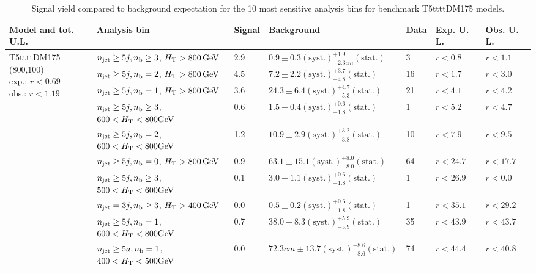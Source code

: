 \begin{table}[h!] 
  \scriptsize
  \caption{ 
Signal yield compared to background expectation for the 10 most sensitive analysis bins 
for benchmark T5ttttDM175 models.
  \label{tab:sigBenchmarksYields_T5ttttDM175}}
  \centering 
  \begin{tabular}{ lllllll } 
    \hline 
    \hline 
    Model and tot. U.L. & Analysis bin & Signal & Background & Data & Exp. U. L. & Obs. U. L. \\ \hline
\multirow{10}{*}{\parbox[t]{2.3cm}{T5ttttDM175 (800,100)\\exp.: $r<0.69$\\obs.: $r<1.19$}}
 & $n_{\mathrm{jet}} \geq5j,n_{\text{b}} \geq3$, $\mbox{$H_\text{T}$} > 800 \, \mathrm{GeV}$ & 2.9 & $0.9 \pm 0.3 \mathrm{(syst.)} ^{+1.9}_{-2.3cm} \mathrm{(stat.)}$ & 3 & $r < 0.8$ & $r < 1.1$\\ 
 & $n_{\mathrm{jet}} \geq5j,n_{\text{b}} =2$, $\mbox{$H_\text{T}$} > 800 \, \mathrm{GeV}$ & 4.5 & $7.2 \pm 2.2 \mathrm{(syst.)} ^{+3.7}_{-4.8} \mathrm{(stat.)}$ & 16 & $r < 1.7$ & $r < 3.0$\\ 
 & $n_{\mathrm{jet}} \geq5j,n_{\text{b}} =1$, $\mbox{$H_\text{T}$} > 800 \, \mathrm{GeV}$ & 3.6 & $24.3 \pm 6.4 \mathrm{(syst.)} ^{+4.7}_{-5.3} \mathrm{(stat.)}$ & 21 & $r < 4.1$ & $r < 4.2$\\ 
 & $n_{\mathrm{jet}} \geq5j,n_{\text{b}} \geq3$, $600 < \mbox{$H_\text{T}$} < 800 \mathrm{GeV}$ & 0.6 & $1.5 \pm 0.4 \mathrm{(syst.)} ^{+0.6}_{-1.8} \mathrm{(stat.)}$ & 1 & $r < 5.2$ & $r < 4.7$\\ 
 & $n_{\mathrm{jet}} \geq5j,n_{\text{b}} =2$, $600 < \mbox{$H_\text{T}$} < 800 \mathrm{GeV}$ & 1.2 & $10.9 \pm 2.9 \mathrm{(syst.)} ^{+3.2}_{-3.8} \mathrm{(stat.)}$ & 10 & $r < 7.9$ & $r < 9.5$\\ 
 & $n_{\mathrm{jet}} \geq5j,n_{\text{b}} =0$, $\mbox{$H_\text{T}$} > 800 \, \mathrm{GeV}$ & 0.9 & $63.1 \pm 15.1 \mathrm{(syst.)} ^{+8.0}_{-8.0} \mathrm{(stat.)}$ & 64 & $r < 24.7$ & $r < 17.7$\\ 
 & $n_{\mathrm{jet}} \geq5j,n_{\text{b}} \geq3$, $500 < \mbox{$H_\text{T}$} < 600 \mathrm{GeV}$ & 0.1 & $3.0 \pm 1.1 \mathrm{(syst.)} ^{+0.6}_{-1.8} \mathrm{(stat.)}$ & 1 & $r < 26.9$ & $r < 0.0$\\ 
 & $n_{\mathrm{jet}} =3j,n_{\text{b}} \geq3$, $\mbox{$H_\text{T}$} > 400 \, \mathrm{GeV}$ & 0.0 & $0.5 \pm 0.2 \mathrm{(syst.)} ^{+0.6}_{-1.8} \mathrm{(stat.)}$ & 1 & $r < 35.1$ & $r < 29.2$\\ 
 & $n_{\mathrm{jet}} \geq5j,n_{\text{b}} =1$, $600 < \mbox{$H_\text{T}$} < 800 \mathrm{GeV}$ & 0.7 & $38.0 \pm 8.3 \mathrm{(syst.)} ^{+5.9}_{-5.9} \mathrm{(stat.)}$ & 35 & $r < 43.9$ & $r < 43.7$\\ 
 & $n_{\mathrm{jet}} \geq5a,n_{\text{b}} =1$, $400 < \mbox{$H_\text{T}$} < 500 \mathrm{GeV}$ & 0.0 & $72.3cm \pm 13.7 \mathrm{(syst.)} ^{+8.6}_{-8.6} \mathrm{(stat.)}$ & 74 & $r < 44.4$ & $r < 40.8$\\ \hline

\end{tabular}
\end{table}
